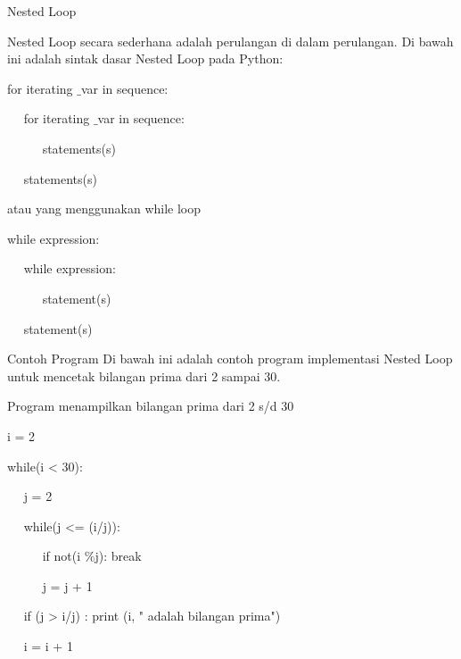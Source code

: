 \vspace{12pt}
Nested Loop \par
\vspace{\baselineskip}
Nested Loop secara sederhana adalah perulangan di dalam perulangan.\vspace{\baselineskip}
\vspace{\baselineskip}
Di bawah ini adalah sintak dasar Nested Loop pada Python:\vspace{\baselineskip}
\vspace{\baselineskip}
 \par
for iterating $  \_  $var in sequence: \par
~~ for iterating $  \_  $var in sequence: \par
~~~~~ statements(s) \par
~~ statements(s) \par
\vspace{\baselineskip}
atau yang menggunakan while loop\vspace{\baselineskip}
\vspace{\baselineskip}
 \par
while expression: \par
~~ while expression: \par
~~~~~ statement(s) \par
~~ statement(s) \par
\vspace{\baselineskip}
Contoh Program\vspace{\baselineskip}
\vspace{\baselineskip}
Di bawah ini adalah contoh program implementasi Nested Loop untuk mencetak bilangan prima dari 2 sampai 30.\vspace{\baselineskip}
\vspace{\baselineskip}
 \par
Program menampilkan bilangan prima dari 2 s/d 30 \par
\vspace{12pt}
i = 2 \par
while(i < 30): \par
~~ j = 2 \par
~~ while(j <= (i/j)): \par
~~~~~ if not(i $  \%  $j): break \par
~~~~~ j = j + 1 \par
~~ if (j > i/j) : print (i, " adalah bilangan prima") \par
~~ i = i + 1 \par
\vspace{12pt}
